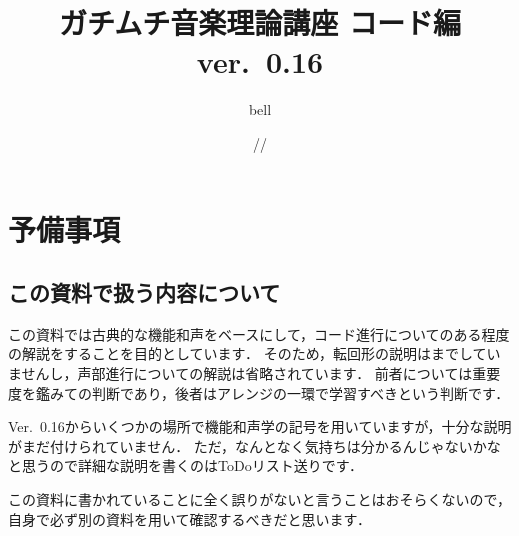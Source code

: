 \documentclass[dvipdfmx,uplatex,b5paper,openany,jbase=12Q,nomag*,textwidth-limit=44%
               ]{gachimuchi}
\title{ガチムチ音楽理論講座 コード編 ver.~0.16}
\author{bell}
\date{\the\year/\the\month/\the\day}
\begin{document}
\frontmatter
\maketitle
{}\tableofcontents
\clearpage%
\chapter{予備事項}%
\section{この資料で扱う内容について}%
この資料では古典的な機能和声をベースにして，コード進行についてのある程度の解説をすることを目的としています．
そのため，転回形の説明はまでしていませんし，声部進行についての解説は省略されています．
前者については重要度を鑑みての判断であり，後者はアレンジの一環で学習すべきという判断です．

Ver.~0.16からいくつかの場所で機能和声学の記号を用いていますが，十分な説明がまだ付けられていません．
ただ，なんとなく気持ちは分かるんじゃないかなと思うので詳細な説明を書くのはToDoリスト送りです．

この資料に書かれていることに全く誤りがないと言うことはおそらくないので，
自身で必ず別の資料を用いて確認するべきだと思います．

\end{document}
